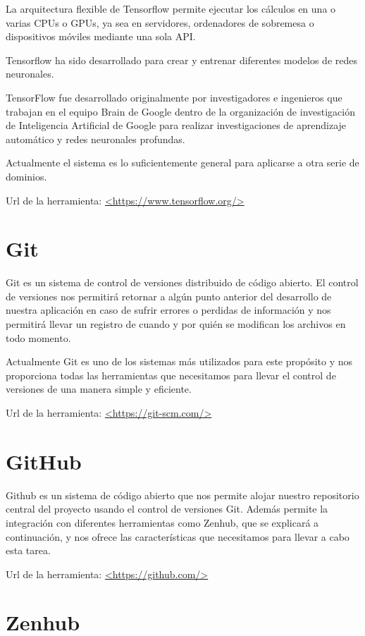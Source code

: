 La arquitectura flexible de Tensorflow permite ejecutar los cálculos en una o varias CPUs o GPUs, ya sea en servidores, ordenadores de sobremesa o dispositivos móviles mediante una sola API.

Tensorflow ha sido desarrollado para crear y entrenar diferentes modelos de redes neuronales.

TensorFlow fue desarrollado originalmente por investigadores e ingenieros que trabajan en el equipo Brain de Google dentro de la organización de investigación de Inteligencia Artificial de Google para realizar investigaciones de aprendizaje automático y redes neuronales profundas. 

Actualmente el sistema es lo suficientemente general para aplicarse a otra serie de dominios.

Url de la herramienta: \url{<https://www.tensorflow.org/>}

\section{Git}

Git es un sistema de control de versiones distribuido de código abierto. El control de versiones nos permitirá retornar a algún punto anterior del desarrollo de nuestra aplicación en caso de sufrir errores o perdidas de información y nos permitirá llevar un registro de cuando y por quién se modifican los archivos en todo momento.

Actualmente Git es uno de los sistemas más utilizados para este propósito y nos proporciona todas las herramientas que necesitamos para llevar el control de versiones de una manera simple y eficiente.

Url de la herramienta: \url{<https://git-scm.com/>}

\section{GitHub}

Github es un sistema de código abierto que nos permite alojar nuestro repositorio central del proyecto usando el control de versiones Git. Además permite la integración con diferentes herramientas como Zenhub, que se explicará a continuación, y nos ofrece las características que necesitamos para llevar a cabo esta tarea.

Url de la herramienta: \url{<https://github.com/>}

\section{Zenhub}

